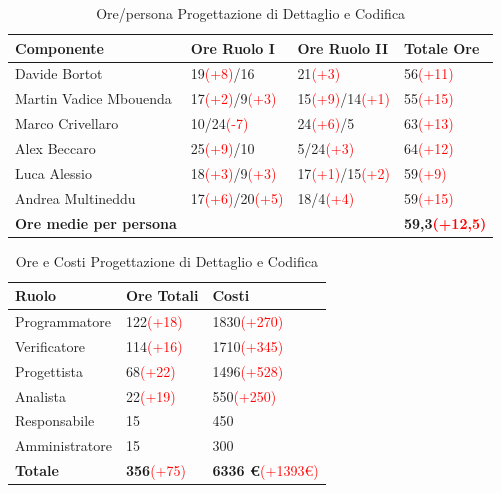 \documentclass[a4paper,11pt]{article}
\begin{document}
		\begin{table}[h!]			
		\begin{center}
			\begin{tabular}{l l l l}
			\textbf{Componente} & \textbf{Ore Ruolo I} & \textbf{Ore Ruolo II} & \textbf{Totale Ore}\\
			\midrule
			Davide Bortot & 19\textcolor{red}{(+8)}/16 & 21\textcolor{red}{(+3)} & 56\textcolor{red}{(+11)}\\
			Martin Vadice Mbouenda & 17\textcolor{red}{(+2)}/9\textcolor{red}{(+3)} & 15\textcolor{red}{(+9)}/14\textcolor{red}{(+1)} & 55\textcolor{red}{(+15)}\\
			Marco Crivellaro & 10/24\textcolor{red}{(-7)} & 24\textcolor{red}{(+6)}/5 & 63\textcolor{red}{(+13)} \\
			Alex Beccaro & 25\textcolor{red}{(+9)}/10 & 5/24\textcolor{red}{(+3)} & 64\textcolor{red}{(+12)}\\
			Luca Alessio & 18\textcolor{red}{(+3)}/9\textcolor{red}{(+3)} & 17\textcolor{red}{(+1)}/15\textcolor{red}{(+2)} & 59\textcolor{red}{(+9)}\\
			Andrea Multineddu & 17\textcolor{red}{(+6)}/20\textcolor{red}{(+5)} & 18/4\textcolor{red}{(+4)} & 59\textcolor{red}{(+15)}\\
			\midrule
			\textbf{Ore medie per persona} & & & \textbf{59,3\textcolor{red}{(+12,5)}}\\
			\end{tabular}
		\end{center}
		\caption{Ore/persona Progettazione di Dettaglio e Codifica}
		\end{table}
		\begin{table}[h!]			
		\begin{center}
			\begin{tabular}{l l l}
			\textbf{Ruolo} & \textbf{Ore Totali} & \textbf{Costi}\\
			\midrule
			Programmatore & 122\textcolor{red}{(+18)} & 1830\textcolor{red}{(+270)} \\
			Verificatore & 114\textcolor{red}{(+16)} & 1710\textcolor{red}{(+345)}\\
			Progettista & 68\textcolor{red}{(+22)} & 1496\textcolor{red}{(+528)}\\
			Analista & 22\textcolor{red}{(+19)} & 550\textcolor{red}{(+250)}\\		
			Responsabile & 15 & 450 \\
			Amministratore & 15 & 300 \\
			\midrule
			\textbf{Totale} & \textbf{356}\textcolor{red}{(+75)} & \textbf{6336 \euro}\textcolor{red}{(+1393\euro)}\\
			\end{tabular}
		\end{center}
		\caption{Ore e Costi Progettazione di Dettaglio e Codifica}
		\end{table}
		\clearpage
		
\end{document}
